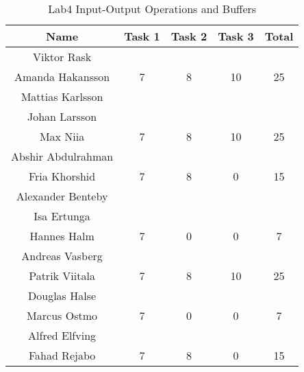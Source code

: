 \documentclass{article}
\begin{document}

\begin{table}[ht]
\caption{Lab4 Input-Output Operations and Buffers}
\centering 
\begin{tabular}{c c c c c} 
\hline\hline 
Name & Task 1 & Task 2 & Task 3 & Total \\ [0.5ex] 
\hline
Viktor Rask \\ Amanda Hakansson 
& 7 & 8 & 10 & 25 \\
\hline 
Mattias Karlsson \\ Johan Larsson \\ Max Niia 
& 7 & 8 & 10 & 25 \\
\hline 
Abshir Abdulrahman \\ Fria Khorshid 
& 7 & 8 & 0 & 15 \\
\hline 
Alexander Benteby \\ Isa Ertunga \\ Hannes Halm 
& 7 & 0 & 0 & 7 \\
\hline
Andreas Vasberg \\ Patrik Viitala
& 7 & 8 & 10 & 25 \\ 
\hline
Douglas Halse \\ Marcus Ostmo
& 7 & 0 & 0 & 7 \\ 
\hline
Alfred Elfving \\ Fahad Rejabo
& 7 & 8 & 0 & 15 \\
\hline
\end{tabular}
\label{table:nonlin}
\end{table}

\end{document}
